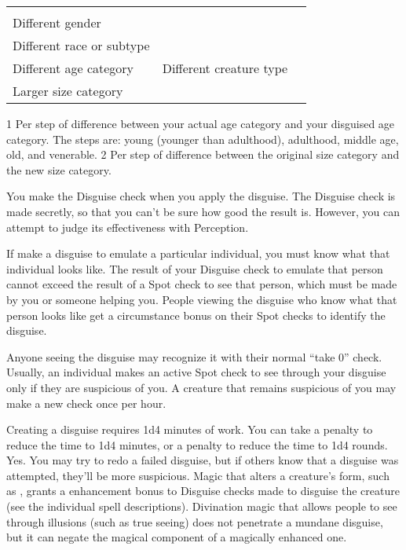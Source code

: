 \begin{dtable}
\begin{tabularx}{\columnwidth}{l >{\ccol}X}
 &  \\
Different gender &  \\
Different race or subtype &  \\
Different age category & 
Different creature type &  \\
Larger size category & 
\end{tabularx}
1 Per step of difference between your actual age category and your
disguised age category. The steps are: young (younger than
adulthood), adulthood, middle age, old, and venerable.
2 Per step of difference between the original size category and the new size category.
\end{dtable}

You make the Disguise check when you apply the disguise. The Disguise check is made secretly, so that you can't be sure how good the result is. However, you can attempt to judge its effectiveness with Perception.

If make a disguise to emulate a particular individual, you must know what that individual looks like. The result of your Disguise check to emulate that person cannot exceed the result of a Spot check to see that person, which must be made by you or someone helping you. People viewing the disguise who know what that person looks like get a  circumstance bonus on their Spot checks to identify the disguise.

\par Anyone seeing the disguise may recognize it with their normal ``take 0'' check. Usually, an individual makes an active Spot check to see through your disguise only if they are suspicious of you. A creature that remains suspicious of you may make a new check once per hour.

 Creating a disguise requires 1d4 minutes of work. You can take a  penalty to reduce the time to 1d4 minutes, or a  penalty to reduce the time to 1d4 rounds.
 Yes. You may try to redo a failed disguise, but if others know that a disguise was attempted, they'll be more suspicious.
 Magic that alters a creature's form, such as , grants a  enhancement bonus to Disguise checks made to disguise the creature (see the individual spell descriptions). Divination magic that allows people to see through illusions (such as true seeing) does not penetrate a mundane disguise, but it can negate the magical component of a magically enhanced one.

